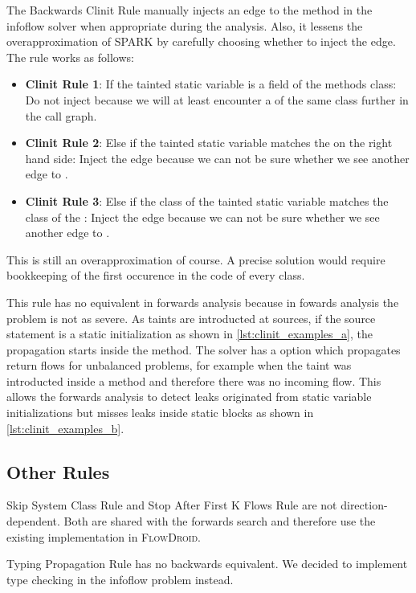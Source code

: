 \documentclass[../draft.tex]{subfiles}
\begin{document}
    The Backwards Clinit Rule manually injects an edge to the  method in the infoflow solver when appropriate during the analysis. Also, it lessens the overapproximation of SPARK by carefully choosing whether to inject the edge. The rule works as follows:
    \begin{itemize}
        \item \textbf{Clinit Rule 1}: If the tainted static variable is a field of the methods class: Do not inject because we will at least encounter a  of the same class further in the call graph.
        \item \textbf{Clinit Rule 2}: Else if the tainted static variable matches the  on the right hand side: Inject the edge because we can not be sure whether we see another edge to .
        \item \textbf{Clinit Rule 3}: Else if the class of the tainted static variable matches the class of the : Inject the edge because we can not be sure whether we see another edge to .
    \end{itemize}
    This is still an overapproximation of course. A precise solution would require bookkeeping of the first occurence in the code of every class. 

    This rule has no equivalent in forwards analysis because in fowards analysis the problem is not as severe. As taints are introducted at sources, if the source statement is a static initialization as shown in \autoref{lst:clinit_examples_a}, the propagation starts inside the  method. The solver has a  option which propagates return flows for unbalanced problems, for example when the taint was introducted inside a method and therefore there was no incoming flow. This allows the forwards analysis to detect leaks originated from static variable initializations but misses leaks inside static blocks as shown in \autoref{lst:clinit_examples_b}.

    \subsection{Other Rules}
    Skip System Class Rule and Stop After First K Flows Rule are not direction-dependent. Both are shared with the forwards search and therefore use the existing implementation in \textsc{FlowDroid}.
    
    Typing Propagation Rule has no backwards equivalent. We decided to implement type checking in the infoflow problem instead.
\end{document}
